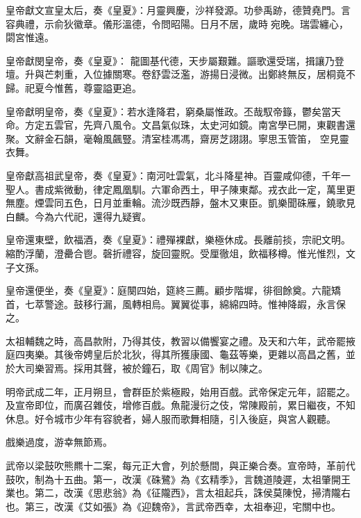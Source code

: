 \begin{pinyinscope}
 皇帝獻文宣皇太后，奏《皇夏》：月靈興慶，沙祥發源。功參禹跡，德贊堯門。言容典禮，示俞狄徽章。儀形溫德，令問昭陽。日月不居，歲時宛晚。瑞雲纏心，閟宮惟遠。



 皇帝獻閔皇帝，奏《皇夏》：
 龍圖基代德，天步屬艱難。謳歌還受瑞，揖讓乃登壇。升與芒刺重，入位據關寒。卷舒雲泛濫，游揚日浸微。出鄭終無反，居桐竟不歸。祀夏今惟舊，尊靈謚更追。



 皇帝獻明皇帝，奏《皇夏》：若水逢降君，窮桑屬惟政。丕哉馭帝籙，鬱矣當天命。方定五雲官，先齊八風令。文昌氣似珠，太史河如鏡。南宮學已開，東觀書還聚。文辭金石韻，毫翰風飆豎。清室桂馮馮，齋房芝詡詡。寧思玉管笛，
 空見靈衣舞。



 皇帝獻高祖武皇帝，奏《皇夏》：南河吐雲氣，北斗降星神。百靈咸仰德，千年一聖人。書成紫微動，律定鳳凰馴。六軍命西土，甲子陳東鄰。戎衣此一定，萬里更無塵。煙雲同五色，日月並重輪。流沙既西靜，盤木又東臣。凱樂聞硃雁，鐃歌見白麟。今為六代祀，還得九疑賓。



 皇帝還東壁，飲福酒，奏《皇夏》：禮殫裸獻，樂極休成。長離前掞，宗祀文明。
 縮酌浮蘭，澄罍合鬯。磬折禮容，旋回靈貺。受厘徹俎，飲福移樽。惟光惟烈，文子文孫。



 皇帝還便坐，奏《皇夏》：庭闋四始，筵終三薦。顧步階墀，徘徊餘奠。六龍矯首，七萃警途。鼓移行漏，風轉相烏。翼翼從事，綿綿四時。惟神降嘏，永言保之。



 太祖輔魏之時，高昌款附，乃得其伎，教習以備饗宴之禮。及天和六年，武帝罷掖庭四夷樂。其後帝娉皇后於北狄，得其所獲康國、龜茲等樂，更雜以高昌之舊，並於大司樂習焉。採用其聲，被於鐘石，取《周官》制以陳之。



 明帝武成二年，正月朔旦，會群臣於紫極殿，始用百戲。武帝保定元年，詔罷之。及宣帝即位，而廣召雜伎，增修百戲。魚龍漫衍之伎，常陳殿前，累日繼夜，不知休息。好令城市少年有容貌者，婦人服而歌舞相隨，引入後庭，與宮人觀聽。



 戲樂過度，游幸無節焉。



 武帝以梁鼓吹熊羆十二案，每元正大會，列於懸間，與正樂合奏。宣帝時，革前代鼓吹，制為十五曲。第一，改漢《硃鷺》為《玄精季》，言魏道陵遲，太祖肇開王業也。第二，改漢《思悲翁》為《征隴西》，言太祖起兵，誅侯莫陳悅，掃清隴右也。第三，改漢《艾如張》為《迎魏帝》，言武帝西幸，太祖奉迎，宅關中也。




\end{pinyinscope}
